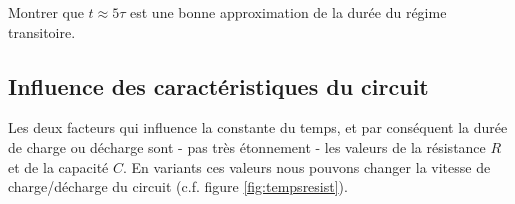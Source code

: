 \documentclass[11pt,a4paper]{article}
\begin{document}
\begin{exo}
Montrer que $t\approx5\tau$ est une bonne approximation de la durée du régime transitoire. 
\vspace{3cm}
\end{exo} 

\subsection{Influence des caractéristiques du circuit} 

Les deux facteurs qui influence la constante du temps, et par conséquent la durée de charge ou décharge sont - pas très étonnement - les valeurs de la résistance $R$ et de la capacité $C$. En variants ces valeurs nous pouvons changer la vitesse de charge/décharge du circuit (c.f. figure \ref{fig:tempsresist}). 
\end{document}
